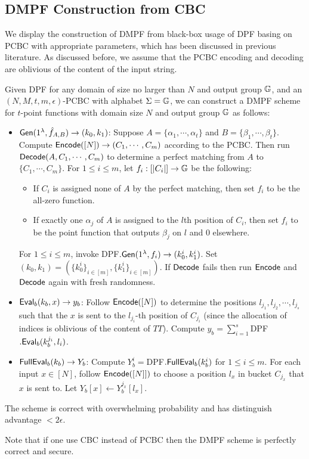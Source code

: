 \subsection{DMPF Construction from CBC}
We display the construction of DMPF from black-box usage of DPF basing on PCBC with appropriate parameters, which has been discussed in previous literature\cite{cryptoeprint:2019/273,cryptoeprint:2021/580}. As discussed before, we assume that the PCBC encoding and decoding are oblivious of the content of the input string.  
\begin{construction}\label{con:DMPF_batch_code}
  Given DPF for any domain of size no larger than $N$ and output group $\mathbb{G}$, and an $(N,M,t,m,\epsilon)$-PCBC with alphabet $\Sigma=\mathbb{G}$, we can construct a DMPF scheme for $t$-point functions with domain size $N$ and output group $\mathbb{G}$ as follows: 
  \begin{itemize}
    \item ${\sf Gen}(1^\lambda, \hat{f}_{A,B})\rightarrow (k_0,k_1)$: Suppose $A=\{\alpha_1,\cdots,\alpha_t\}$ and $B=\{\beta_1,\cdots,\beta_t\}$. Compute ${\sf Encode}([N])\rightarrow (C_1,\cdots,C_m)$ according to the PCBC. Then run ${\sf Decode}(A, C_1,\cdots, C_m)$ to determine a perfect matching from $A$ to $\{C_1,\cdots,C_m\}$. For $1\le i\le m$, let $f_i:[|C_i|]\rightarrow \mathbb{G}$ be the following: 
    \begin{itemize}
      \item If $C_i$ is assigned none of $A$ by the perfect matching, then set $f_i$ to be the all-zero function. 
      \item If exactly one $\alpha_j$ of $A$ is assigned to the $l$th position of $C_i$, then set $f_i$ to be the point function that outputs $\beta_j$ on $l$ and 0 elsewhere. 
    \end{itemize}
    For $1\le i\le m$, invoke DPF$.{\sf Gen}(1^\lambda, f_i)\rightarrow (k_0^i,k_1^i)$. Set $(k_0,k_1)=(\{k_0^i\}_{i\in [m]}, \{k_1^i\}_{i\in [m]})$. If ${\sf Decode}$ fails then run ${\sf Encode}$ and ${\sf Decode}$ again with fresh randomness. 
    \item ${\sf Eval}_b(k_b,x)\rightarrow y_b$: Follow ${\sf Encode}([N])$ to determine the positions $l_{j_1},l_{j_2},\cdots, l_{j_s}$ such that the $x$ is sent to the $l_{j_i}$-th position of $C_{j_i}$ (since the allocation of indices is oblivious of the content of $TT$). Compute $y_b=\sum_{i=1}^s$DPF$.{\sf Eval}_b(k_b^{j_i},l_i)$. 
    \item ${\sf FullEval}_b(k_b)\rightarrow Y_b$: Compute $Y_b^i = $DPF$.{\sf FullEval}_b(k_b^i)$ for $1\le i\le m$. For each input $x\in [N]$, follow ${\sf Encode}([N]])$ to choose a position $l_x$ in bucket $C_{j_x}$ that $x$ is sent to. Let $Y_b[x]\gets Y_b^{j_x}[l_x]$. 
  \end{itemize}
The scheme is correct with overwhelming probability and has distinguish advantage $<2\epsilon$. 
\end{construction}
Note that if one use CBC instead of PCBC then the DMPF scheme is perfectly correct and secure. 

